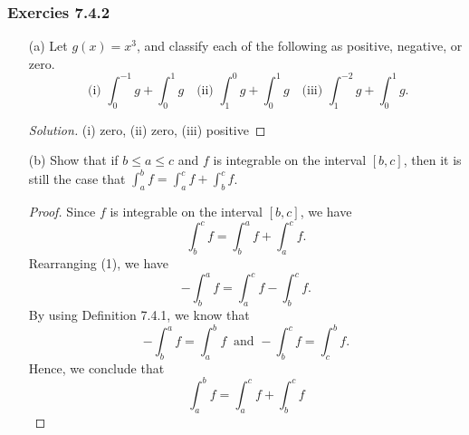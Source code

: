 \subsubsection{Exercies 7.4.2}  
\begin{enumerate}
    \item[(a)] Let \( g(x) = x^{3}  \), and classify each of the following as positive, negative, or zero.
		\[  \text{ (i) } \int_{ 0 }^{ -1 } g + \int_{ 0 }^{ 1 } g \ \ \   \text{ (ii) } \int_{ 1 }^{ 0 } g + \int_{ 0 }^{ 1 }  g \ \ \ \text{ (iii) } \int_{ 1 }^{ -2 } g + \int_{ 0 }^{ 1 } g.  \]
		\begin{proof}[Solution]
			(i) zero, (ii) zero, (iii) positive 
		\end{proof}
	\item[(b)] Show that if \( b \leq a \leq c  \) and \( f  \) is integrable on the interval \( [b,c]  \), then it is still the case that \( \int_{ a }^{ b } f = \int_{ a }^{ c } f + \int_{ b }^{ c } f  \).
		\begin{proof}
			Since \( f  \) is integrable on the interval \( [b,c]  \), we have 
			\[  \int_{ b }^{ c } f   = \int_{ b }^{ a } f  + \int_{ a }^{ c } f. \tag{1} \]
			Rearranging (1), we have 
			\[  - \int_{ b }^{ a } f = \int_{ a }^{ c } f  - \int_{ b }^{ c } f.\] By using Definition 7.4.1, we know that 
			\[  - \int_{ b }^{ a } f = \int_{ a }^{ b } f  \ \text{ and }  -\int_{ b }^{ c } f = \int_{ c }^{ b } f.  \]
			Hence, we conclude that 
			\[ \int_{ a }^{ b } f = \int_{ a }^{ c } f + \int_{ b }^{ c } f  \]

		\end{proof}
\end{enumerate}

